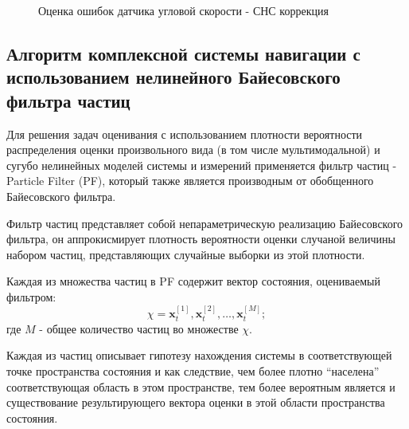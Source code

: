 \documentclass[14pt]{article}
\begin{document}
\begin{figure}
\noindent{}
\caption{Оценка ошибок датчика угловой скорости - СНС коррекция}
\label{fig:gps_gyro_bias}
\end{figure}

\clearpage

\subsection{Алгоритм комплексной системы навигации с использованием нелинейного Байесовского фильтра частиц}
Для решения задач оценивания с использованием плотности вероятности распределения оценки произвольного вида (в том числе мультимодальной) и сугубо нелинейных моделей системы и измерений применяется фильтр частиц - Particle Filter (PF), который также является производным от обобщенного Байесовского фильтра.

Фильтр частиц представляет собой непараметрическую реализацию Байесовского фильтра, он  аппрокисмирует плотность вероятности оценки случаной величины набором частиц, представляющих случайные выборки из этой плотности. 

Каждая из множества частиц в PF содержит вектор состояния, оцениваемый фильтром:
\begin{equation}
\chi = \mathbf x_t^{[1]}, \mathbf x_t^{[2]}, \hdots, \mathbf x_t^{[M]};
\end{equation}
где $M$ - общее количество частиц во множестве $\chi$.

Каждая из частиц описывает гипотезу нахождения системы в соответствующей точке пространства состояния и как следствие, чем более плотно ``населена'' соответствующая область в этом пространстве, тем более вероятным является и существование  результирующего вектора оценки в этой области пространства состояния.
\end{document}
